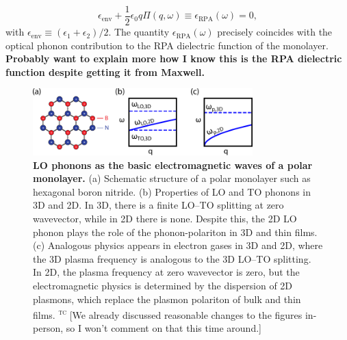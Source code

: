 \documentclass[aps,prb,twocolumn,
	           groupedaddress,superscriptaddress,
               amsfonts,amssymb,amsmath,floatfix,
	           citeautoscript]{revtex4-1}
\newcommand{\comment}[2]{%
    \ifbool{togglecomments}%
    {\textcolor{blue!70!black}{\small\textsf{%
    \textsuperscript{\textsc{\textsf{\MakeLowercase{#1}}}}%
    [#2]}}} %
    {}}     %
\begin{document}
\begin{equation}
    \epsilon_{\mathrm{env}} + \frac{1}{2}\epsilon_0 q \Pi(q,\omega) \equiv \epsilon_{\mathrm{RPA}}(\omega) = 0,
    \label{eq:dispeq}
\end{equation}
with $\epsilon_{\mathrm{env}}\equiv (\epsilon_1+\epsilon_2)/2$. The quantity $\epsilon_{\mathrm{RPA}}(\omega)$ precisely coincides with the optical phonon contribution to the RPA dielectric function of the monolayer. \textbf{Probably want to explain more how I know this is the RPA dielectric function despite getting it from Maxwell.}




\begin{figure}[t]
    \includegraphics[width=85mm]{fig1.pdf}
    \caption{%
        \textbf{LO phonons as the basic electromagnetic waves of a polar monolayer.} (a) Schematic structure of a polar monolayer such as hexagonal boron nitride. (b) Properties of LO and TO phonons in 3D and 2D. In 3D, there is a finite LO--TO splitting at zero wavevector, while in 2D there is none. Despite this, the 2D LO phonon plays the role of the phonon-polariton in 3D and thin films. (c) Analogous physics appears in electron gases in 3D and 2D, where the 3D plasma frequency is analogous to the 3D LO--TO splitting. In 2D, the plasma frequency at zero wavevector is zero, but the electromagnetic physics is determined by the dispersion of 2D plasmons, which replace the plasmon polariton of bulk and thin films.
        \comment{tc}{We already discussed reasonable changes to the figures in-person, so I won't comment on that this time around.}
        \label{fig:1}
        }
\end{figure}~
\end{document}
